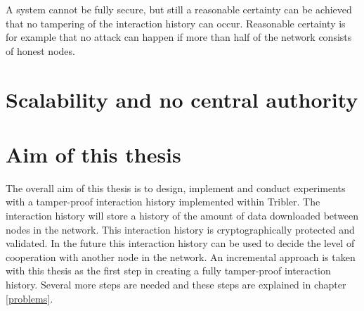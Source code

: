A system cannot be fully secure, 
but still a reasonable certainty can be achieved that no tampering of the interaction history can occur.
Reasonable certainty is for example that no attack can happen 
if more than half of the network consists of honest nodes.

\section{Scalability and no central authority}

\section{Aim of this thesis}
\label{pb-aim}
The overall aim of this thesis is to design, implement and conduct experiments with a tamper-proof interaction history
implemented within Tribler.
The interaction history will store a history of the amount of data downloaded between nodes in the network.
This interaction history is cryptographically protected and validated.
In the future this interaction history can be used to decide the level of cooperation with another node in the network.
An incremental approach is taken with this thesis as the first step in creating a fully tamper-proof interaction history.
Several more steps are needed and these steps are explained in chapter \ref{problems}.
